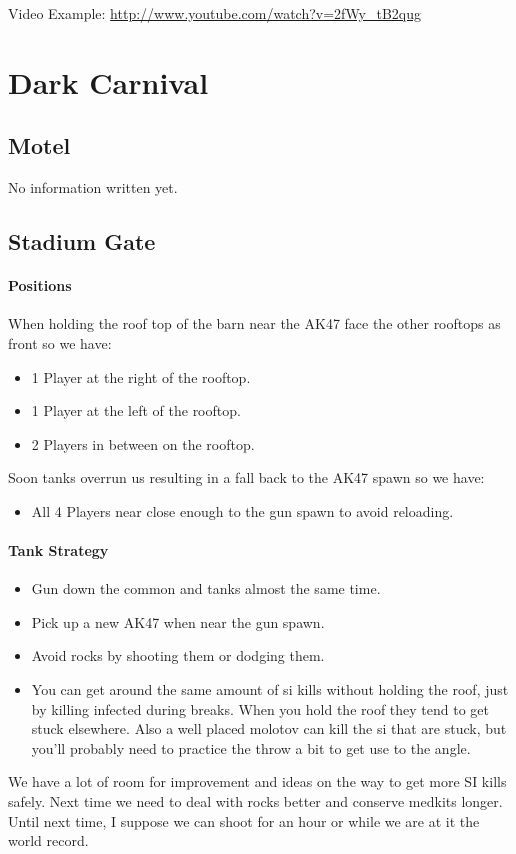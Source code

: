 Video Example: \url{http://www.youtube.com/watch?v=2fWy_tB2qug}

\section{Dark Carnival}

\subsection{Motel}
No information written yet.

\subsection{Stadium Gate}
\paragraph{Positions}
When holding the roof top of the barn near the AK47 face the other rooftops as front so we have:
\begin{itemize}
\item 1 Player at the right of the rooftop.
\item 1 Player at the left of the rooftop.
\item 2 Players in between on the rooftop.
\end{itemize}
Soon tanks overrun us resulting in a fall back to the AK47 spawn so we have:
\begin{itemize}
\item All 4 Players near close enough to the gun spawn to avoid reloading.
\end{itemize}

\paragraph{Tank Strategy}
\begin{itemize}
\item Gun down the common and tanks almost the same time.
\item Pick up a new AK47 when near the gun spawn.
\item Avoid rocks by shooting them or dodging them.
\item You can get around the same amount of si kills without holding the roof, just by killing infected during breaks. When you hold the roof they tend to get stuck elsewhere. Also a well placed molotov can kill the si that are stuck, but you'll probably need to practice the throw a bit to get use to the angle.
\end{itemize}
We have a lot of room for improvement and ideas on the way to get more SI kills safely. Next time we need to deal with rocks better and conserve medkits longer. Until next time, I suppose we can shoot for an hour or while we are at it the world record.

